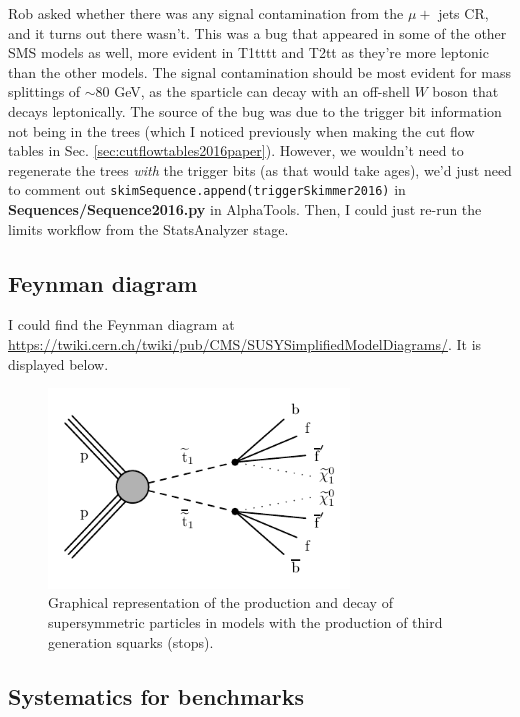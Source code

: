 
Rob asked whether there was any signal contamination from the $\mu +$ jets CR, and it turns out there wasn't. This was a bug that appeared in some of the other SMS models as well, more evident in T1tttt and T2tt as they're more leptonic than the other models. The signal contamination should be most evident for mass splittings of $\sim 80$ GeV, as the sparticle can decay with an off-shell $W$ boson that decays leptonically. The source of the bug was due to the trigger bit information not being in the trees (which I noticed previously when making the cut flow tables in Sec. \ref{sec:cutflowtables2016paper}). However, we wouldn't need to regenerate the trees \emph{with} the trigger bits (as that would take ages), we'd just need to comment out \texttt{skimSequence.append(triggerSkimmer2016)} in \textbf{Sequences/Sequence2016.py} in AlphaTools. Then, I could just re-run the limits workflow from the StatsAnalyzer stage.


\subsection{Feynman diagram}

I could find the Feynman diagram at \url{https://twiki.cern.ch/twiki/pub/CMS/SUSYSimplifiedModelDiagrams/}. It is displayed below.

\begin{figure}[H]
\centering
\includegraphics[width=80mm]{./sec31/T2tt-4bd_Feynman_diagram.pdf}
\caption{Graphical representation of the production and decay of supersymmetric particles in models with the production of third generation squarks (stops).}
\end{figure}


\subsection{Systematics for benchmarks}

